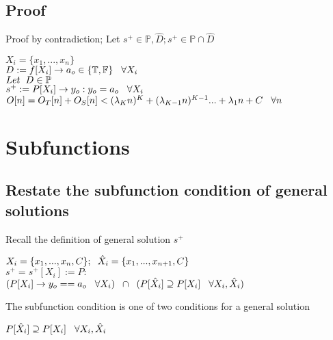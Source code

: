 \documentclass[11pt]{article}
\begin{document}
\subsection{Proof}
Proof by contradiction; Let $s^+ \in \mathbb{P}, \hat{D}; s^+ \in \mathbb{P} \cap \hat{D}$
\begin{center}
$
X_i = \{x_1,...,x_n\}
$
\\ \vspace{2mm}
$
D := f \lbrack X_i \rbrack \rightarrow a_{o} \in \{\mathbb{T}, \mathbb{F}\} \hspace{3mm} \forall X_i
$
\\ \vspace{6mm}
$
Let \hspace{2mm} D \in \mathbb{P}
$
\\ \vspace{2mm}
$
s^+ := P \lbrack X_i \rbrack \rightarrow y_{o} : y_o = a_{o} \hspace{3mm} \forall X_i
$
\\ \vspace{2mm}
$
O[n] = O_T[n] + O_S[n] < (\lambda_K n)^K + (\lambda_{K-1} n)^{K-1}... + \lambda_1 n + C \hspace{3mm} \forall n
$
\end{center}










\newpage
\section{Subfunctions}





\subsection{Restate the subfunction condition of general solutions}
Recall the definition of general solution $s^+$
\begin{center}
$
X_i = \{x_1,...,x_n,C\}; \hspace{2mm} \hat{X}_i = \{x_1,...,x_{n+1},C\}
$
\\ \vspace{2mm}
$
s^+ = s^+[X_i] := P :
$
\\ \vspace{2mm}
$
(P \lbrack X_i \rbrack \rightarrow y_{o} == a_{o} \hspace{3mm} \forall X_i) \hspace{2mm} \cap \hspace{2mm} (P[\hat{X}_i] \supseteq P[X_i] \hspace{3mm} \forall X_i,\hat{X}_i)
$
\end{center}
\vspace{3mm}
The subfunction condition is one of two conditions for a general solution
\begin{center}
$
P[\hat{X}_i] \supseteq P[X_i] \hspace{3mm} \forall X_i,\hat{X}_i
$
\end{center}
\end{document}
